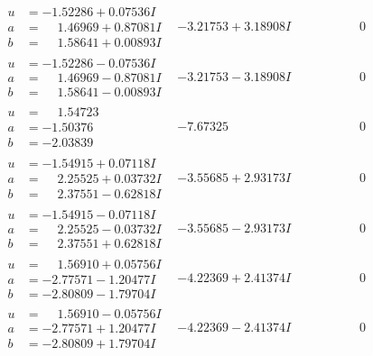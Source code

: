 \documentclass[1p]{elsarticle_modified}
\theoremstyle{definition}
\begin{document}
$$\begin{array}{c|c|c}
\begin{aligned}
u &= -1.52286 + 0.07536 I \\
a &= \phantom{-}1.46969 + 0.87081 I \\
b &= \phantom{-}1.58641 + 0.00893 I\end{aligned}
 & -3.21753 + 3.18908 I & \phantom{-0.000000 } 0 \\ \hline\begin{aligned}
u &= -1.52286 - 0.07536 I \\
a &= \phantom{-}1.46969 - 0.87081 I \\
b &= \phantom{-}1.58641 - 0.00893 I\end{aligned}
 & -3.21753 - 3.18908 I & \phantom{-0.000000 } 0 \\ \hline\begin{aligned}
u &= \phantom{-}1.54723\phantom{ +0.000000I} \\
a &= -1.50376\phantom{ +0.000000I} \\
b &= -2.03839\phantom{ +0.000000I}\end{aligned}
 & -7.67325\phantom{ +0.000000I} & \phantom{-0.000000 } 0 \\ \hline\begin{aligned}
u &= -1.54915 + 0.07118 I \\
a &= \phantom{-}2.25525 + 0.03732 I \\
b &= \phantom{-}2.37551 - 0.62818 I\end{aligned}
 & -3.55685 + 2.93173 I & \phantom{-0.000000 } 0 \\ \hline\begin{aligned}
u &= -1.54915 - 0.07118 I \\
a &= \phantom{-}2.25525 - 0.03732 I \\
b &= \phantom{-}2.37551 + 0.62818 I\end{aligned}
 & -3.55685 - 2.93173 I & \phantom{-0.000000 } 0 \\ \hline\begin{aligned}
u &= \phantom{-}1.56910 + 0.05756 I \\
a &= -2.77571 - 1.20477 I \\
b &= -2.80809 - 1.79704 I\end{aligned}
 & -4.22369 + 2.41374 I & \phantom{-0.000000 } 0 \\ \hline\begin{aligned}
u &= \phantom{-}1.56910 - 0.05756 I \\
a &= -2.77571 + 1.20477 I \\
b &= -2.80809 + 1.79704 I\end{aligned}
 & -4.22369 - 2.41374 I & \phantom{-0.000000 } 0 \\ \hline\begin{aligned}

\end{aligned}
\end{array}$$
\end{document}

